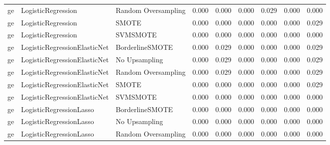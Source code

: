 \begin{tabular}{lllllllll}
      ge &           LogisticRegression & Random Oversampling & 0.000 &                     0.000 &                 0.000 &                  0.029 &                                   0.000 &     0.000 \\
      ge &           LogisticRegression &               SMOTE & 0.000 &                     0.000 &                 0.000 &                  0.000 &                                   0.000 &     0.029 \\
      ge &           LogisticRegression &            SVMSMOTE & 0.000 &                     0.000 &                 0.000 &                  0.000 &                                   0.000 &     0.000 \\
      ge & LogisticRegressionElasticNet &     BorderlineSMOTE & 0.000 &                     0.029 &                 0.000 &                  0.000 &                                   0.000 &     0.029 \\
      ge & LogisticRegressionElasticNet &       No Upsampling & 0.000 &                     0.029 &                 0.000 &                  0.000 &                                   0.000 &     0.029 \\
      ge & LogisticRegressionElasticNet & Random Oversampling & 0.000 &                     0.029 &                 0.000 &                  0.000 &                                   0.000 &     0.029 \\
      ge & LogisticRegressionElasticNet &               SMOTE & 0.000 &                     0.000 &                 0.000 &                  0.000 &                                   0.000 &     0.029 \\
      ge & LogisticRegressionElasticNet &            SVMSMOTE & 0.000 &                     0.000 &                 0.000 &                  0.000 &                                   0.000 &     0.000 \\
      ge &      LogisticRegressionLasso &     BorderlineSMOTE & 0.000 &                     0.000 &                 0.000 &                  0.000 &                                   0.000 &     0.000 \\
      ge &      LogisticRegressionLasso &       No Upsampling & 0.000 &                     0.000 &                 0.000 &                  0.000 &                                   0.000 &     0.000 \\
      ge &      LogisticRegressionLasso & Random Oversampling & 0.000 &                     0.000 &                 0.000 &                  0.000 &                                   0.000 &     0.000 \\

\end{tabular}
